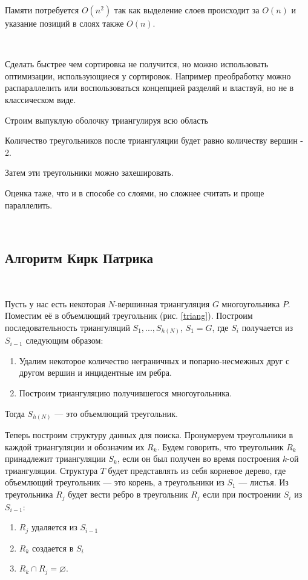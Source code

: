 Памяти потребуется $O(n^2)$ так как выделение слоев происходит за $O(n)$ и указание позиций в слоях также $O(n)$.

\

Сделать быстрее чем сортировка не получится, но можно использовать оптимизации, использующиеся у сортировок. Например преобработку можно распараллелить или воспользоваться концепцией разделяй и властвуй, но не в классическом виде.

Строим выпуклую оболочку триангулируя всю область

Количество треугольников после триангуляции будет равно количеству вершин - 2.

Затем эти треугольники можно захешировать.

Оценка таже, что и в способе со слоями, но сложнее считать и проще параллелить.

\

\subsection{Алгоритм Кирк Патрика}

\

Пусть у нас есть некоторая $N$-вершинная триангуляция $G$ многоугольника $P$. Поместим её в объемлющий треугольник (рис. \ref{triang}).
Построим последовательность триангуляций $S_1, ..., S_{h(N)}$, $S_1 = G$, где $S_i$ получается из $S_{i - 1}$ следующим образом:
\begin{enumerate}
    \item Удалим некоторое количество неграничных и попарно-несмежных друг с другом вершин и инцидентные им ребра.
    \item Построим триангуляцию получившегося многоугольника.
\end{enumerate}
Тогда $S_{h(N)}$ --- это объемлющий треугольник.

Теперь построим структуру данных для поиска. Пронумеруем треугольники в каждой триангуляции и обозначим их $R_k$.
Будем говорить, что треугольник $R_k$ принадлежит триангуляции $S_k$, если он был получен во время построения $k$-ой триангуляции.
Структура $T$ будет представлять из себя корневое дерево, где объемлющий треугольник --- это корень, а треугольники из $S_1$ --- листья.
Из треугольника $R_j$ будет вести ребро в треугольник $R_j$ если при построении $S_i$ из $S_{i - 1}$:
\begin{enumerate}
    \item $R_j$ удаляется из $S_{i - 1}$
    \item $R_k$ создается в $S_i$
    \item $R_k \cap R_j = \varnothing$.
\end{enumerate}

